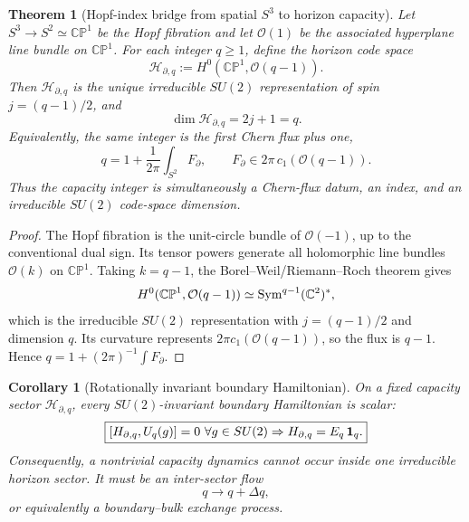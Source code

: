 \documentclass[aps,prd,reprint,nofootinbib,superscriptaddress,floatfix]{revtex4-2}
\numberwithin{equation}{section}
\theoremstyle{definition}
\theoremstyle{plain}
\newtheorem{theorem}{Theorem}[section]
\newtheorem{corollary}{Corollary}[section]
\newcommand{\CP}{\mathbb{CP}}
\begin{document}
\begin{theorem}[Hopf-index bridge from spatial \texorpdfstring{\(S^3\)}{S3} to horizon capacity]
\label{thm:hopf-index-bridge}
Let \(S^3\to S^2\simeq\CP^1\) be the Hopf fibration and let
\(\mathcal O(1)\) be the associated hyperplane line bundle on \(\CP^1\).
For each integer \(q\ge1\), define the horizon code space
\begin{equation}
\boxed{
\mathcal H_{\partial,q}:=
H^0\!\left(\CP^1,\mathcal O(q-1)\right).
}
\end{equation}
Then \(\mathcal H_{\partial,q}\) is the unique irreducible \(SU(2)\)
representation of spin \(j=(q-1)/2\), and
\begin{equation}
\boxed{
\dim \mathcal H_{\partial,q}=2j+1=q.
}
\end{equation}
Equivalently, the same integer is the first Chern flux plus one,
\begin{equation}
\boxed{
q=1+\frac{1}{2\pi}\int_{S^2}F_{\partial},
\qquad
F_\partial\in2\pi\,c_1\!\left(\mathcal O(q-1)\right).
}
\end{equation}
Thus the capacity integer is simultaneously a Chern-flux datum, an
index, and an irreducible \(SU(2)\) code-space dimension.
\end{theorem}

\begin{proof}
The Hopf fibration is the unit-circle bundle of \(\mathcal O(-1)\), up to
the conventional dual sign.  Its tensor powers generate all holomorphic
line bundles \(\mathcal O(k)\) on \(\CP^1\).  Taking \(k=q-1\), the
Borel--Weil/Riemann--Roch theorem gives
\[
H^0(\CP^1,\mathcal O(q-1))\simeq {\rm Sym}^{q-1}(\mathbb C^2)^*,
\]
which is the irreducible \(SU(2)\) representation with
\(j=(q-1)/2\) and dimension \(q\).  Its curvature represents
\(2\pi c_1(\mathcal O(q-1))\), so the flux is \(q-1\).  Hence
\(q=1+(2\pi)^{-1}\int F_\partial\).
\end{proof}

\begin{corollary}[Rotationally invariant boundary Hamiltonian]
\label{cor:rotational-boundary-hamiltonian}
On a fixed capacity sector \(\mathcal H_{\partial,q}\), every
\(SU(2)\)-invariant boundary Hamiltonian is scalar:
\begin{equation}
\boxed{
[H_{\partial,q},U_q(g)]=0\ \forall g\in SU(2)
\Rightarrow
H_{\partial,q}=E_q\,{\bf 1}_{q}.
}
\end{equation}
Consequently, a nontrivial capacity dynamics cannot occur inside one
irreducible horizon sector.  It must be an inter-sector flow
\[
q\longrightarrow q+\Delta q,
\]
or equivalently a boundary--bulk exchange process.
\end{corollary}
\end{document}
